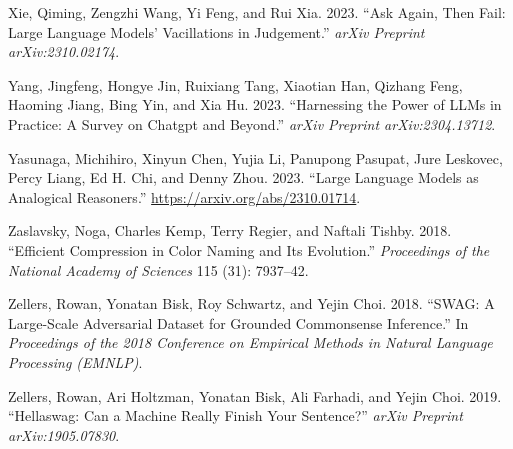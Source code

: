\documentclass[
]{article}
\newlength{\cslhangindent}
\newenvironment{CSLReferences}[2] %
 {\begin{list}{}{%
  \setlength{\itemindent}{0pt}
  \setlength{\leftmargin}{0pt}
  \setlength{\parsep}{0pt}
  \ifodd #1
   \setlength{\leftmargin}{\cslhangindent}
   \setlength{\itemindent}{-1\cslhangindent}
  \fi
  \setlength{\itemsep}{#2\baselineskip}}}
 {\end{list}}
\begin{document}
\begin{CSLReferences}{1}{0}
Xie, Qiming, Zengzhi Wang, Yi Feng, and Rui Xia. 2023. {``Ask Again,
Then Fail: Large Language Models' Vacillations in Judgement.''}
\emph{arXiv Preprint arXiv:2310.02174}.

Yang, Jingfeng, Hongye Jin, Ruixiang Tang, Xiaotian Han, Qizhang Feng,
Haoming Jiang, Bing Yin, and Xia Hu. 2023. {``Harnessing the Power of
LLMs in Practice: A Survey on Chatgpt and Beyond.''} \emph{arXiv
Preprint arXiv:2304.13712}.

Yasunaga, Michihiro, Xinyun Chen, Yujia Li, Panupong Pasupat, Jure
Leskovec, Percy Liang, Ed H. Chi, and Denny Zhou. 2023. {``Large
Language Models as Analogical Reasoners.''}
\url{https://arxiv.org/abs/2310.01714}.

Zaslavsky, Noga, Charles Kemp, Terry Regier, and Naftali Tishby. 2018.
{``Efficient Compression in Color Naming and Its Evolution.''}
\emph{Proceedings of the National Academy of Sciences} 115 (31):
7937--42.

Zellers, Rowan, Yonatan Bisk, Roy Schwartz, and Yejin Choi. 2018.
{``SWAG: A Large-Scale Adversarial Dataset for Grounded Commonsense
Inference.''} In \emph{Proceedings of the 2018 Conference on Empirical
Methods in Natural Language Processing (EMNLP)}.

Zellers, Rowan, Ari Holtzman, Yonatan Bisk, Ali Farhadi, and Yejin Choi.
2019. {``Hellaswag: Can a Machine Really Finish Your Sentence?''}
\emph{arXiv Preprint arXiv:1905.07830}.

\end{CSLReferences}
\end{document}
